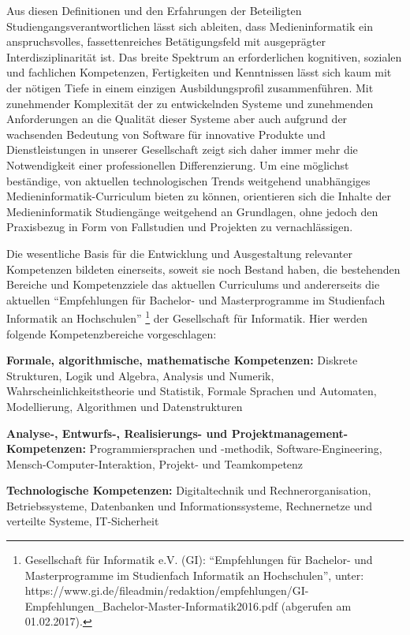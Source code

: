 Aus diesen Definitionen und den Erfahrungen der Beteiligten
Studiengangsverantwortlichen lässt sich ableiten, dass Medieninformatik
ein anspruchsvolles, fassettenreiches Betätigungsfeld mit ausgeprägter
Interdisziplinarität ist. Das breite Spektrum an erforderlichen
kognitiven, sozialen und fachlichen Kompetenzen, Fertigkeiten und
Kenntnissen lässt sich kaum mit der nötigen Tiefe in einem einzigen
Ausbildungsprofil zusammenführen. Mit zunehmender Komplexität der zu
entwickelnden Systeme und zunehmenden Anforderungen an die Qualität
dieser Systeme aber auch aufgrund der wachsenden Bedeutung von Software
für innovative Produkte und Dienstleistungen in unserer Gesellschaft
zeigt sich daher immer mehr die Notwendigkeit einer professionellen
Differenzierung. Um eine möglichst beständige, von aktuellen
technologischen Trends weitgehend unabhängiges
Medieninformatik-Curriculum bieten zu können, orientieren sich die
Inhalte der Medieninformatik Studiengänge weitgehend an Grundlagen, ohne
jedoch den Praxisbezug in Form von Fallstudien und Projekten zu
vernachlässigen.

Die wesentliche Basis für die Entwicklung und Ausgestaltung relevanter
Kompetenzen bildeten einerseits, soweit sie noch Bestand haben, die
bestehenden Bereiche und Kompetenzziele das aktuellen Curriculums und
andererseits die aktuellen ``Empfehlungen für Bachelor- und
Masterprogramme im Studienfach Informatik an Hochschulen'' \footnote{Gesellschaft
  für Informatik e.V. (GI): ``Empfehlungen für Bachelor- und
  Masterprogramme im Studienfach Informatik an Hochschulen'', unter:
  https://www.gi.de/fileadmin/redaktion/empfehlungen/GI-Empfehlungen\_Bachelor-Master-Informatik2016.pdf
  (abgerufen am 01.02.2017).} der Gesellschaft für Informatik. Hier
werden folgende Kompetenzbereiche vorgeschlagen:

\textbf{Formale, algorithmische, mathematische Kompetenzen:} Diskrete
Strukturen, Logik und Algebra, Analysis und Numerik,
Wahrscheinlichkeitstheorie und Statistik, Formale Sprachen und
Automaten, Modellierung, Algorithmen und Datenstrukturen

\textbf{Analyse-, Entwurfs-, Realisierungs- und
Projektmanagement-Kompetenzen:} Programmiersprachen und -methodik,
Software-Engineering, Mensch-Computer-Interaktion, Projekt- und
Teamkompetenz

\textbf{Technologische Kompetenzen:} Digitaltechnik und
Rechnerorganisation, Betriebssysteme, Datenbanken und
Informationssysteme, Rechnernetze und verteilte Systeme, IT-Sicherheit

